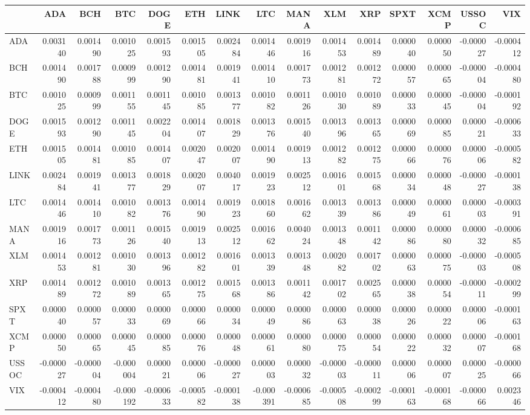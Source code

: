 \begin{tabular}{lrrrrrrrrrrrrrr}
\toprule
 & ADA & BCH & BTC & DOGE & ETH & LINK & LTC & MANA & XLM & XRP & SPXT & XCMP & USSOC & VIX \\
\midrule
ADA & 0.003140 & 0.001490 & 0.001025 & 0.001593 & 0.001505 & 0.002484 & 0.001446 & 0.001916 & 0.001453 & 0.001489 & 0.000040 & 0.000050 & -0.000027 & -0.000412 \\
BCH & 0.001490 & 0.001788 & 0.000999 & 0.001290 & 0.001481 & 0.001941 & 0.001410 & 0.001773 & 0.001281 & 0.001272 & 0.000057 & 0.000065 & -0.000004 & -0.000480 \\
BTC & 0.001025 & 0.000999 & 0.001155 & 0.001145 & 0.001085 & 0.001377 & 0.001082 & 0.001126 & 0.001030 & 0.001089 & 0.000033 & 0.000045 & -0.000004 & -0.000192 \\
DOGE & 0.001593 & 0.001290 & 0.001145 & 0.002204 & 0.001407 & 0.001829 & 0.001376 & 0.001540 & 0.001396 & 0.001365 & 0.000069 & 0.000085 & 0.000021 & -0.000633 \\
ETH & 0.001505 & 0.001481 & 0.001085 & 0.001407 & 0.002047 & 0.002007 & 0.001490 & 0.001913 & 0.001282 & 0.001275 & 0.000066 & 0.000076 & 0.000006 & -0.000582 \\
LINK & 0.002484 & 0.001941 & 0.001377 & 0.001829 & 0.002007 & 0.004017 & 0.001923 & 0.002512 & 0.001601 & 0.001568 & 0.000034 & 0.000048 & -0.000027 & -0.000138 \\
LTC & 0.001446 & 0.001410 & 0.001082 & 0.001376 & 0.001490 & 0.001923 & 0.001860 & 0.001662 & 0.001339 & 0.001386 & 0.000049 & 0.000061 & 0.000003 & -0.000391 \\
MANA & 0.001916 & 0.001773 & 0.001126 & 0.001540 & 0.001913 & 0.002512 & 0.001662 & 0.004024 & 0.001348 & 0.001142 & 0.000086 & 0.000080 & 0.000032 & -0.000685 \\
XLM & 0.001453 & 0.001281 & 0.001030 & 0.001396 & 0.001282 & 0.001601 & 0.001339 & 0.001348 & 0.002082 & 0.001702 & 0.000063 & 0.000075 & -0.000003 & -0.000508 \\
XRP & 0.001489 & 0.001272 & 0.001089 & 0.001365 & 0.001275 & 0.001568 & 0.001386 & 0.001142 & 0.001702 & 0.002565 & 0.000038 & 0.000054 & -0.000011 & -0.000299 \\
SPXT & 0.000040 & 0.000057 & 0.000033 & 0.000069 & 0.000066 & 0.000034 & 0.000049 & 0.000086 & 0.000063 & 0.000038 & 0.000026 & 0.000022 & 0.000006 & -0.000163 \\
XCMP & 0.000050 & 0.000065 & 0.000045 & 0.000085 & 0.000076 & 0.000048 & 0.000061 & 0.000080 & 0.000075 & 0.000054 & 0.000022 & 0.000032 & 0.000007 & -0.000168 \\
USSOC & -0.000027 & -0.000004 & -0.000004 & 0.000021 & 0.000006 & -0.000027 & 0.000003 & 0.000032 & -0.000003 & -0.000011 & 0.000006 & 0.000007 & 0.000025 & -0.000066 \\
VIX & -0.000412 & -0.000480 & -0.000192 & -0.000633 & -0.000582 & -0.000138 & -0.000391 & -0.000685 & -0.000508 & -0.000299 & -0.000163 & -0.000168 & -0.000066 & 0.002346 \\
\bottomrule
\end{tabular}
